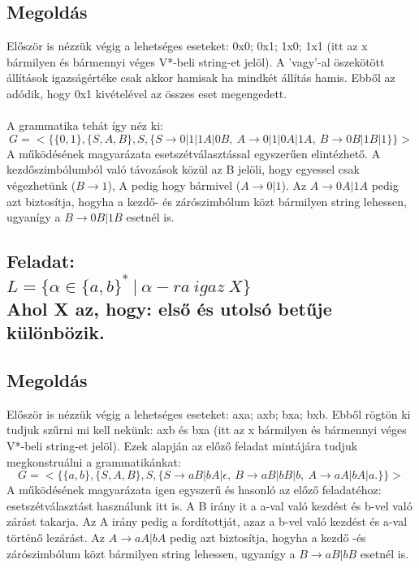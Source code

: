 \documentclass[12pt]{article}
\begin{document}
\subsection{Megoldás}
Először is nézzük végig a lehetséges eseteket: 0x0; 0x1; 1x0; 1x1
(itt az x bármilyen és bármennyi véges V*-beli string-et jelöl).
A 'vagy'-al öszekötött állítások igazságértéke csak akkor hamisak ha mindkét állítás hamis.
Ebből az adódik, hogy 0x1 kivételével az összes eset megengedett. \\\\
A grammatika tehát így néz ki: \\
$$ G=<\{ \{0,1\}, \{S,A,B \}, S, \{ S \rightarrow 0|1|1A|0B, \ A \rightarrow 0|1|0A|1A, \ B 
\rightarrow 0B|1B|1 \} \}> $$
A működésének magyarázata esetszétválasztással egyszerűen elintézhető. A kezdőszimbólumból való távozások
közül az B jelöli, hogy egyessel csak végezhetünk ($ B \rightarrow 1 $), 
A pedig hogy bármivel ($ A \rightarrow 0|1 $).
Az $ A \rightarrow 0A|1A $ pedig azt biztosítja, hogyha a kezdő- és zárószimbólum közt bármilyen 
string lehessen, ugyanígy a $ B \rightarrow 0B|1B $
esetnél is.

\subsection{Feladat: \\
$ L=\{ \alpha \in \{ a,b \}^* \ | \ \alpha-ra \ igaz \ X \} $ \\
Ahol X az, hogy: első és utolsó betűje különbözik.}
\maketitle
\subsection{Megoldás}
Először is nézzük végig a lehetséges eseteket: axa; axb; bxa; bxb. Ebből rögtön ki tudjuk szűrni mi kell nekünk:
axb és bxa (itt az x bármilyen és bármennyi véges V*-beli string-et jelöl).
Ezek alapján az előző feladat mintájára tudjuk megkonstruálni a grammatikánkat:
$$ G=<\{ \{a,b\}, \{S,A,B \}, S,
\{ S \rightarrow aB|bA|\epsilon, \ B \rightarrow aB|bB|b, \ A \rightarrow aA|bA|a. \} \}> $$
A működésének magyarázata igen egyszerű és hasonló az előző feladatéhoz:
esetszétválasztást használunk itt is. A B irány it a a-val való kezdést és b-vel való zárást takarja.
Az A irány pedig a fordítottját, azaz a b-vel való kezdést és a-val történő lezárást.
Az $ A \rightarrow aA|bA $ pedig azt biztosítja, hogyha a kezdő -és zárószimbólum közt bármilyen 
string lehessen, ugyanígy a $ B \rightarrow aB|bB $ esetnél is.
\end{document}
